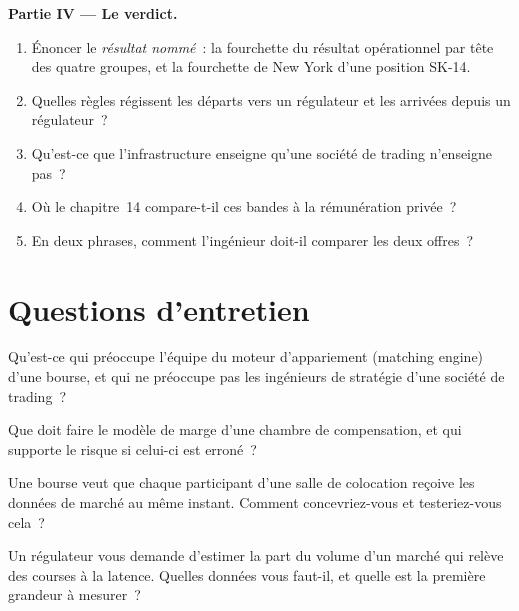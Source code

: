 \begin{problem}
\medskip\noindent\textbf{Partie IV --- Le verdict.}
\begin{enumerate}[resume]
\item Énoncer le \emph{résultat nommé}~: la fourchette du résultat opérationnel par tête des quatre groupes, et
la fourchette de New York d'une position SK-14.
\item Quelles règles régissent les départs vers un régulateur et les arrivées depuis un régulateur~?
\item Qu'est-ce que l'infrastructure enseigne qu'une société de trading n'enseigne pas~?
\item Où le chapitre~14 compare-t-il ces bandes à la rémunération privée~?
\item En deux phrases, comment l'ingénieur doit-il comparer les deux offres~?
\end{enumerate}
\end{problem}

\section{Questions d'entretien}

\begin{interviewq}\label{iq:in:exchanges-brokers-vendors-and-regulators-as-employers:1}
Qu'est-ce qui préoccupe l'équipe du moteur d'appariement (matching engine) d'une bourse, et qui ne préoccupe pas les ingénieurs de stratégie d'une société de trading~?
\end{interviewq}

\begin{interviewq}\label{iq:in:exchanges-brokers-vendors-and-regulators-as-employers:2}
Que doit faire le modèle de marge d'une chambre de compensation, et qui supporte le risque si celui-ci est erroné~?
\end{interviewq}

\begin{interviewq}\label{iq:in:exchanges-brokers-vendors-and-regulators-as-employers:3}
Une bourse veut que chaque participant d'une salle de colocation reçoive les données de marché au même instant. Comment concevriez-vous
et testeriez-vous cela~?
\end{interviewq}

\begin{interviewq}\label{iq:in:exchanges-brokers-vendors-and-regulators-as-employers:4}
Un régulateur vous demande d'estimer la part du volume d'un marché qui relève des courses à la latence. Quelles données vous faut-il, et quelle est
la première grandeur à mesurer~?
\end{interviewq}

